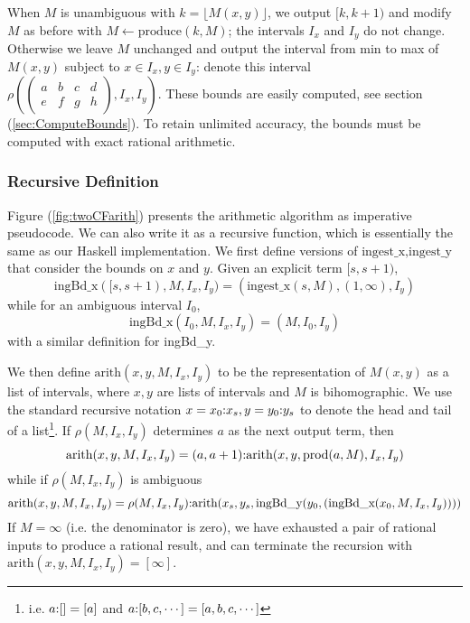 \documentclass[11pt, oneside]{amsart}   	%
\newcommand{\abcd}{\left(
\begin{smallmatrix} 
a & b & c & d\\ 
e & f & g & h
\end{smallmatrix}
\right)}
\renewcommand{\:}{\negthickspace:\negthickspace}
\begin{document}
When $M$ is unambiguous with $k = \lfloor M(x,y) \rfloor$, we output $[k,k+1)$ and modify $M$ as before with $M \leftarrow \mbox{produce}(k,M)$;
the intervals $I_x$ and $I_y$ do not change. Otherwise we leave $M$ unchanged and output the interval from min to max of $M(x,y)$ subject to $x \in I_x, y \in I_y$:
denote this interval $\rho\left(\abcd, I_x, I_y\right)$.
These bounds are easily computed, see section (\ref{sec:ComputeBounds}).
To retain unlimited accuracy, the bounds must be computed with exact rational arithmetic.


\subsubsection{Recursive Definition}
Figure (\ref{fig:twoCFarith}) presents the arithmetic algorithm as imperative pseudocode. We can also write it as a recursive function,
which is essentially the same as our Haskell implementation.
We first define versions of $\mbox{ingest\_x},\mbox{ingest\_y}$ that consider the bounds on $x$ and $y$. Given an explicit term $[s,s+1)$,
\[
\mbox{ingBd\_x}([s,s+1), M, I_x, I_y) = 
(\mbox{ingest\_x}(s,M), (1,\infty),I_y)
\]
while for an ambiguous interval $I_0$,
\[
\mbox{ingBd\_x}(I_0, M, I_x, I_y) = 
(M, I_0,I_y)
\]
with a similar definition for \mbox{ingBd\_y}.

We then define
$\mbox{arith}(x,y, M, I_x, I_y)$
to be the representation of $M(x,y)$ as a list of intervals, where $x,y$ are lists of intervals and $M$ is bihomographic. We use the standard recursive notation $x = x_0\:x_s, y = y_0\:y_s$ to denote the head and tail of a list\footnote{i.e. $a\:[] = [a]$ and $a\:[b,c,\cdots] = [a,b,c,\cdots]$}.  If $\rho(M,I_x,I_y)$ determines $a$ as the next output term, then
\[
\mbox{arith}(x,y, M, I_x, I_y) = (a,a+1)\:\mbox{arith}(x,y,  \mbox{prod}(a,M) ,  I_x,  I_y)
\]
while if $\rho(M,I_x,I_y)$ is ambiguous
\[
\mbox{arith}(x,y, M, I_x, I_y) = \rho(M,I_x,I_y)\:\mbox{arith}(x_s,y_s,  \mbox{ingBd\_y}( y_0, (\mbox{ingBd\_x}(x_0,M,I_x,I_y)) ))
\]
If $M=\infty$ (i.e. the denominator is zero), we have exhausted a pair of rational inputs to produce a rational result, and can terminate the recursion with $\mbox{arith}(x,y, M, I_x, I_y) = [\infty]$.

\end{document}
